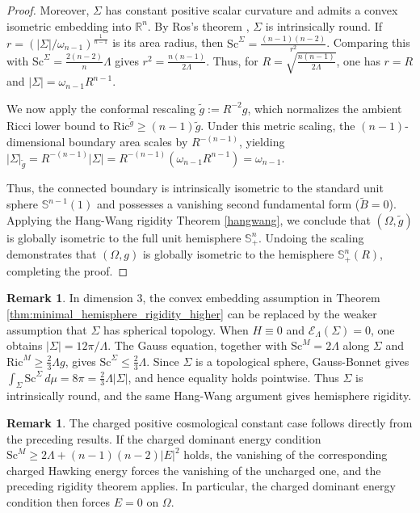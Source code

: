 \documentclass[12pt,a4paper]{amsart}
\theoremstyle{plain}
\theoremstyle{definition}
\newtheorem{remark}[theorem]{Remark}
\begin{document}
\begin{proof}
Moreover, $\Sigma$ has constant positive scalar curvature and admits a convex isometric embedding into $\mathbb R^n$. By Ros's theorem \cite{ros1988compact}, $\Sigma$ is intrinsically round. If $r=\left(|\Sigma|/\omega_{n-1}\right)^{\frac{1}{n-1}}$ is its area radius, then $\mathrm{Sc}^{\Sigma}=\frac{(n-1)(n-2)}{r^2}$. Comparing this with $\mathrm{Sc}^{\Sigma}=\frac{2(n-2)}{n}\Lambda$ gives $r^2=\frac{n(n-1)}{2\Lambda}$. Thus, for $R=\sqrt{\frac{n(n-1)}{2\Lambda}}$, one has $r=R$ and $|\Sigma|=\omega_{n-1}R^{n-1}$.





We now apply the conformal rescaling $\tilde{g} := R^{-2}g$, which normalizes the ambient Ricci lower bound to $\mathrm{Ric}^{\tilde{g}} \ge (n-1)\tilde{g}$. Under this metric scaling, the $(n-1)$-dimensional boundary area scales by $R^{-(n-1)}$, yielding $
    |\Sigma|_{\tilde{g}} = R^{-(n-1)} |\Sigma| = R^{-(n-1)} \left( \omega_{n-1} R^{n-1} \right) = \omega_{n-1}$.
    
Thus, the connected boundary is intrinsically isometric to the standard unit sphere $\mathbb{S}^{n-1}(1)$ and possesses a vanishing second fundamental form ($\tilde{B} = 0$). Applying the Hang-Wang rigidity Theorem \ref{hangwang}, we conclude that $(\Omega, \tilde{g})$ is globally isometric to the full unit hemisphere $\mathbb{S}^n_+$. Undoing the scaling demonstrates that $(\Omega, g)$ is globally isometric to the hemisphere $\mathbb{S}^n_+(R)$, completing the proof.
\end{proof}
\begin{remark}
In dimension $3$, the convex embedding assumption in Theorem \ref{thm:minimal_hemisphere_rigidity_higher} can be replaced by the weaker assumption that $\Sigma$ has spherical topology. When $H\equiv 0$ and $\mathcal E_\Lambda(\Sigma)=0$, one obtains $|\Sigma|=12\pi/\Lambda$. The Gauss equation, together with $\mathrm{Sc}^M=2\Lambda$ along $\Sigma$ and $\mathrm{Ric}^M\ge \frac{2}{3}\Lambda g$, gives $\mathrm{Sc}^{\Sigma}\le \frac{2}{3}\Lambda$. Since $\Sigma$ is a topological sphere, Gauss-Bonnet gives $\int_\Sigma \mathrm{Sc}^{\Sigma}\,d\mu=8\pi=\frac{2}{3}\Lambda|\Sigma|$, and hence equality holds pointwise. Thus $\Sigma$ is intrinsically round, and the same Hang-Wang argument gives hemisphere rigidity.
\end{remark}
\begin{remark}
    The charged positive cosmological constant case follows directly from the preceding results. If the charged dominant energy condition $\mathrm{Sc}^M\ge 2\Lambda+(n-1)(n-2)|E|^2$
holds, the vanishing of the corresponding charged Hawking energy forces the vanishing of the uncharged one, and the preceding rigidity theorem applies. In particular, the charged dominant energy condition then forces $E=0$ on $\Omega$.
\end{remark}
\end{document}
